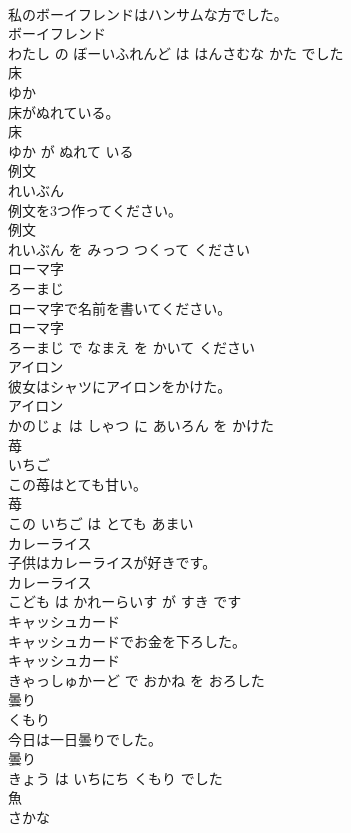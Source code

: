 \documentclass[8pt]{extreport}
\begin{document}
\begin{CJK}{UTF8}{min}
\\	私のボーイフレンドはハンサムな方でした。	
\\	ボーイフレンド 
\\	わたし の ぼーいふれんど は はんさむな かた でした			
\\	床	
\\	ゆか			
\\	床がぬれている。	
\\	床 
\\	ゆか が ぬれて いる			
\\	例文	
\\	れいぶん			
\\	例文を3つ作ってください。	
\\	例文 
\\	れいぶん を みっつ つくって ください			
\\	ローマ字	
\\	ろーまじ			
\\	ローマ字で名前を書いてください。	
\\	ローマ字 
\\	ろーまじ で なまえ を かいて ください			
\\	アイロン	
\\	彼女はシャツにアイロンをかけた。	
\\	アイロン 
\\	かのじょ は しゃつ に あいろん を かけた			
\\	苺	
\\	いちご			
\\	この苺はとても甘い。	
\\	苺 
\\	この いちご は とても あまい			
\\	カレーライス	
\\	子供はカレーライスが好きです。	
\\	カレーライス 
\\	こども は かれーらいす が すき です			
\\	キャッシュカード	
\\	キャッシュカードでお金を下ろした。	
\\	キャッシュカード 
\\	きゃっしゅかーど で おかね を おろした			
\\	曇り	
\\	くもり			
\\	今日は一日曇りでした。	
\\	曇り 
\\	きょう は いちにち くもり でした			
\\	魚	
\\	さかな			

\end{CJK}
\end{document}
